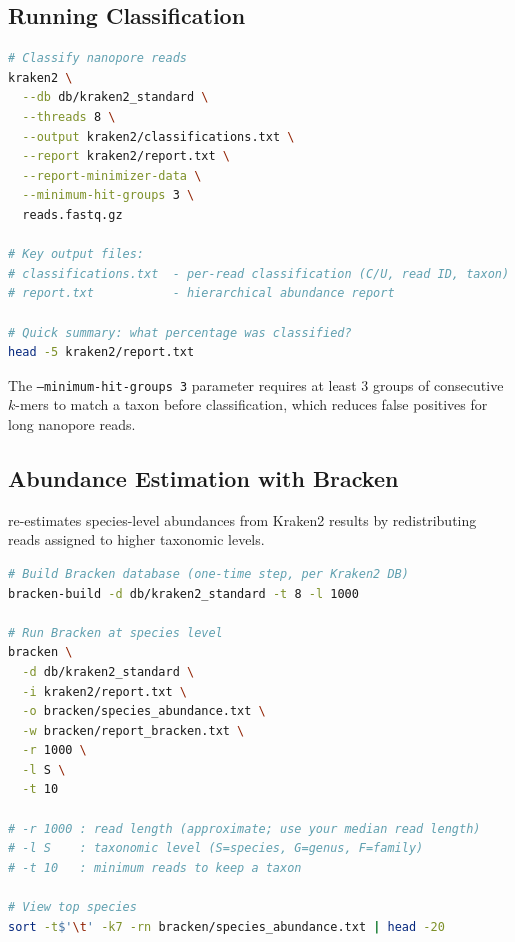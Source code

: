 \subsection{Running Classification}
\label{subsec:diyanalysis:kraken_classify}

\begin{lstlisting}[language=bash,caption={Classifying reads with Kraken2.},label=lst:diy-kraken-classify]
# Classify nanopore reads
kraken2 \
  --db db/kraken2_standard \
  --threads 8 \
  --output kraken2/classifications.txt \
  --report kraken2/report.txt \
  --report-minimizer-data \
  --minimum-hit-groups 3 \
  reads.fastq.gz

# Key output files:
# classifications.txt  - per-read classification (C/U, read ID, taxon)
# report.txt           - hierarchical abundance report

# Quick summary: what percentage was classified?
head -5 kraken2/report.txt
\end{lstlisting}

The \texttt{--minimum-hit-groups 3} parameter requires at least 3 groups of consecutive $k$-mers to match a taxon before classification, which reduces false positives for long nanopore reads.

\subsection{Abundance Estimation with Bracken}
\label{subsec:diyanalysis:bracken}

 re-estimates species-level abundances from Kraken2 results by redistributing reads assigned to higher taxonomic levels.

\begin{lstlisting}[language=bash,caption={Running Bracken for abundance estimation.},label=lst:diy-bracken]
# Build Bracken database (one-time step, per Kraken2 DB)
bracken-build -d db/kraken2_standard -t 8 -l 1000

# Run Bracken at species level
bracken \
  -d db/kraken2_standard \
  -i kraken2/report.txt \
  -o bracken/species_abundance.txt \
  -w bracken/report_bracken.txt \
  -r 1000 \
  -l S \
  -t 10

# -r 1000 : read length (approximate; use your median read length)
# -l S    : taxonomic level (S=species, G=genus, F=family)
# -t 10   : minimum reads to keep a taxon

# View top species
sort -t$'\t' -k7 -rn bracken/species_abundance.txt | head -20
\end{lstlisting}


